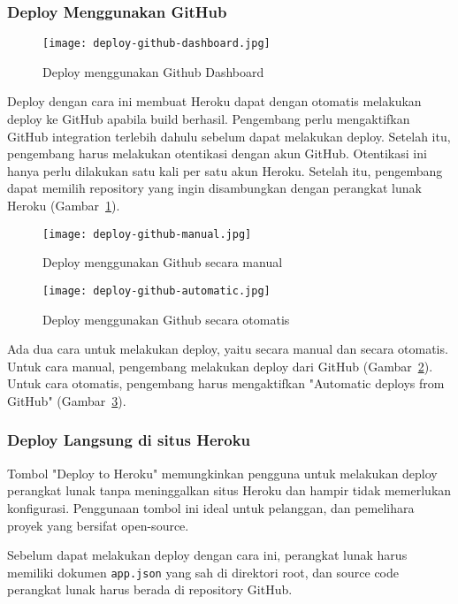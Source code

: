 \subsubsection{Deploy Menggunakan GitHub}
\begin{figure}[H]
	\centering  
	\texttt{[image: deploy-github-dashboard.jpg]}  
	\caption[Deploy menggunakan Github Dashboard]{Deploy menggunakan Github Dashboard} 
	\label{fig:deploy-github-dashboard} 
\end{figure}
Deploy dengan cara ini membuat Heroku dapat dengan otomatis melakukan deploy ke GitHub apabila build berhasil. Pengembang perlu mengaktifkan GitHub integration terlebih dahulu sebelum dapat melakukan deploy. Setelah itu, pengembang harus melakukan otentikasi dengan akun GitHub. Otentikasi ini hanya perlu dilakukan satu kali per satu akun Heroku. Setelah itu, pengembang dapat memilih repository yang ingin disambungkan dengan perangkat lunak Heroku (Gambar~\ref{fig:deploy-github-dashboard}).

\begin{figure}[H]
	\centering  
	\texttt{[image: deploy-github-manual.jpg]}  
	\caption[Deploy menggunakan Github secara manual]{Deploy menggunakan Github secara manual} 
	\label{fig:deploy-github-manual} 
\end{figure}
\begin{figure}[H]
	\centering  
	\texttt{[image: deploy-github-automatic.jpg]}  
	\caption[Deploy menggunakan Github secara otomatis]{Deploy menggunakan Github secara otomatis} 
	\label{fig:deploy-github-automatic} 
\end{figure}
Ada dua cara untuk melakukan deploy, yaitu secara manual dan secara otomatis. Untuk cara manual, pengembang melakukan deploy dari GitHub (Gambar~\ref{fig:deploy-github-manual}). Untuk cara otomatis, pengembang harus mengaktifkan "Automatic deploys from GitHub" (Gambar~\ref{fig:deploy-github-automatic}).

\subsubsection{Deploy Langsung di situs Heroku}
Tombol "Deploy to Heroku" memungkinkan pengguna untuk melakukan deploy perangkat lunak tanpa meninggalkan situs Heroku dan hampir tidak memerlukan konfigurasi. Penggunaan tombol ini ideal untuk pelanggan, dan pemelihara proyek yang bersifat open-source.

Sebelum dapat melakukan deploy dengan cara ini, perangkat lunak harus memiliki dokumen \texttt{app.json} yang sah di direktori root, dan source code perangkat lunak harus berada di repository GitHub.

